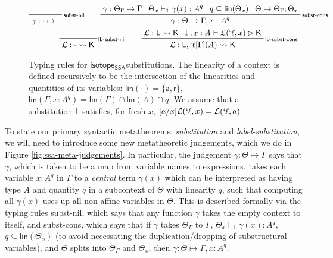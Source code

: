 \documentclass[acmsmall,screen,review]{acmart}
\newcommand{\mc}[1]{\ensuremath{\mathcal{#1}}}
\newcommand{\ms}[1]{\ensuremath{\mathsf{#1}}}
\newcommand{\lbl}[1]{{`#1}}
\newcommand{\brb}[2]{\ms{br}\;#1\;#2}
\newcommand{\lbrb}[2]{\brb{\lbl{#1}}{#2}}
\newcommand{\csplits}[3]{#1 \mapsto #2;#3}
\newcommand{\tlin}[2]{#2 \subseteq \ms{lin}(#1)}
\newcommand{\thyp}[3]{#1: {#2}^{#3}}
\newcommand{\lhyp}[3]{#1[#2](#3)}
\newcommand{\llhyp}[3]{\lhyp{\lbl{#1}}{#2}{#3}}
\newcommand{\rle}[1]{{\scriptsize\textsf{#1}}}
\newcommand{\tint}{{\{\ms{a}, \ms{r}\}}}
\newcommand{\hasty}[5]{#1 \vdash_{#2} #3: {#4}^{#5}}
\newcommand{\haslb}[3]{#1 \vdash #2 \rhd #3}
\newcommand{\issubst}[3]{#1: #2 \mapsto #3}
\newcommand{\lbsubst}[3]{#1: #2 \rightsquigarrow #3}
\newcommand{\isotopessa}{\ms{isotope_{SSA}}}
\begin{document}
\begin{figure}
  \begin{gather*}
    \prftree[r]{\rle{subst-nil}}
      {\issubst{\gamma}{\cdot}{\cdot}}
      \qquad
    \prftree[r]{\rle{subst-cons}}
      {\issubst{\gamma}{\Theta_\Gamma}{\Gamma}}
      {\hasty{\Theta_x}{1}{\gamma(x)}{A}{q}}
      {\tlin{\Theta_x}{q}}
      {\csplits{\Theta}{\Theta_\Gamma}{\Theta_x}}
      {\issubst{\gamma}{\Theta}{\Gamma, \thyp{x}{A}{q}}}
    \\
    \prftree[r]{\rle{lb-subst-nil}}
    {\lbsubst{\mc{L}}{\cdot}{\ms{K}}}
      \qquad
    \prftree[r]{\rle{lb-subst-cons}}
      {\lbsubst{\mc{L}}{\ms{L}}{\ms{K}}}
      {\haslb{\Gamma, \thyp{x}{A}{}}{\mc{L}(\lbl{\ell}, x)}{\ms{K}}}
      {\lbsubst{\mc{L}}{\ms{L}, \llhyp{\ell}{\Gamma}{A}}{\ms{K}}}
  \end{gather*}
  \caption{ Typing rules for \isotopessa substitutions. The linearity of a
    context is defined recursively to be the intersection of the linearities and
    quantities of its variables: \(\ms{lin}(\cdot) = \tint\),
    \(\ms{lin}(\Gamma, \thyp{x}{A}{q}) = \ms{lin}(\Gamma) \cap \ms{lin}(A) \cap
    q\). We assume that a substitution \(\ms{L}\) satisfies, for fresh \(x\),
    \([a/x]\mc{L}(\lbl{\ell}, x) = \mc{L}(\lbl{\ell}, a)\).
  }
  \label{fig:ssa-subst-typing}
\end{figure}

To state our primary syntactic metatheorems, \textit{substitution} and
\textit{label-substitution}, we will need to introduce some new metatheoretic
judgements, which we do in Figure \ref{fig:ssa-meta-judgements}. In particular,
the judgement \(\issubst{\gamma}{\Theta}{\Gamma}\) says that \(\gamma\), which
is taken to be a map from variable names to expressions, takes each variable
\(\thyp{x}{A}{q}\) in \(\Gamma\) to a \textit{central} term \(\gamma(x)\) which
can be interpreted as having type \(A\) and quantity \(q\) in a subcontext of
\(\Theta\) with linearity \(q\), such that computing all \(\gamma(x)\) uses up
all non-affine variables in \(\Theta\). This is described formally via the
typing rules \rle{subst-nil}, which says that any function \(\gamma\) takes the
empty context to itself, and \rle{subst-cons}, which says that if \(\gamma\)
takes \(\Theta_\Gamma\) to \(\Gamma\), \(\hasty{\Theta_x}{1}{\gamma(x)}{A}{q}\),
\(q \subseteq \ms{lin}(\Theta_x)\) (to avoid necessating the
duplication/dropping of substructural variables), and \(\Theta\) splits into
\(\Theta_\Gamma\) and \(\Theta_x\), then \(\issubst{\gamma}{\Theta}{\Gamma,
\thyp{x}{A}{q}}\).
\end{document}
